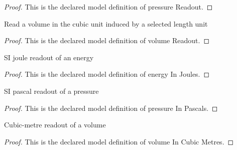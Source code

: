 \begin{proof}
  This is the declared model definition of pressure Readout.
\end{proof}
\begin{definition}
  \label{def:physics:phyx-mini-0341:phyxminiproblems-problemphyxmini0341-volumereadout}
  Read a volume in the cubic unit induced by a selected length unit
\end{definition}
\begin{proof}
  This is the declared model definition of volume Readout.
\end{proof}
\begin{definition}
  \label{def:physics:phyx-mini-0341:phyxminiproblems-problemphyxmini0341-energyinjoules}
  SI joule readout of an energy
\end{definition}
\begin{proof}
  This is the declared model definition of energy In Joules.
\end{proof}
\begin{definition}
  \label{def:physics:phyx-mini-0341:phyxminiproblems-problemphyxmini0341-pressureinpascals}
  SI pascal readout of a pressure
\end{definition}
\begin{proof}
  This is the declared model definition of pressure In Pascals.
\end{proof}
\begin{definition}
  \label{def:physics:phyx-mini-0341:phyxminiproblems-problemphyxmini0341-volumeincubicmetres}
  Cubic-metre readout of a volume
\end{definition}
\begin{proof}
  This is the declared model definition of volume In Cubic Metres.
\end{proof}
